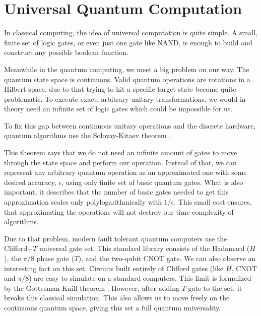 \section{Universal Quantum Computation}

In classical computing, the idea of universal computation is quite simple.
A small, finite set of logic gates, or even just one gate like NAND, is enough to build and construct any possible boolean function.

%
%
Meanwhile in  the quantum computing, we meet a big problem on our way.
The quantum state space is continuous.
Valid quantum operations are rotations in a Hilbert space, due to that
trying to hit a specific target state become quite problematic.
To execute exact, arbitrary unitary transformations, we would in theory need an infinite set of logic gates which could be impossible for us.

%
%
To fix this gap between continuous unitary operations and the discrete hardware, 
quantum algorithms use the Solovay-Kitaev theorem \cite{dawson2005}.

%
%
This theorem says that we do not need an infinite amount of gates to move through the state space and perform our operation.
Instead of that, we can represent any arbitrary quantum operation as an approximated one with some desired accuracy, $\epsilon$, 
using only finite set of basic quantum gates. 
What is also important, it describes that the number of basic gates needed to get this approximation scales only 
polylogarithmically with $1/\epsilon$.
This small cost ensures, that approximating the operations will not destroy our time complexity of algorithms.

%
%
Due to that problem, modern fault tolerant quantum computers use the Clifford+$T$ universal gate set.
This standard library consists of the Hadamard ($H$), the $\pi/8$ phase gate ($T$), and the two-qubit CNOT gate.
We can also observe an interesting fact on this set. 
Circuits built entirely of Clifford gates (like $H$, CNOT and $\pi/8$) are easy to simulate on a standard computers.
This limit is formalized by the Gottesman-Knill theorem \cite{nielsen2010quantum}.
However, after adding $T$ gate to the set, it breaks this classical simulation.
This also allows us to move freely on the continuous quantum space, giving this set a full quantum universality.